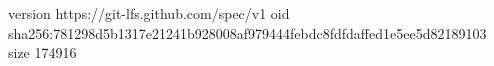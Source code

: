 version https://git-lfs.github.com/spec/v1
oid sha256:781298d5b1317e21241b928008af979444febdc8fdfdaffed1e5ee5d82189103
size 174916

